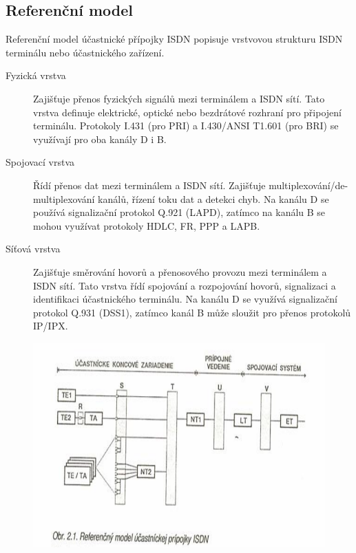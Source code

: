 \subsection{Referenční model}
Referenční model účastnické přípojky ISDN popisuje vrstvovou strukturu ISDN terminálu nebo účastnického zařízení.
\begin{description}
    \item[Fyzická vrstva] Zajišťuje přenos fyzických signálů mezi terminálem a ISDN sítí. Tato vrstva definuje elektrické, optické nebo bezdrátové rozhraní pro připojení terminálu. Protokoly I.431 (pro PRI) a I.430/ANSI T1.601 (pro BRI) se využívají pro oba kanály D i B.
    \item[Spojovací vrstva] Řídí přenos dat mezi terminálem a ISDN sítí. Zajišťuje multiplexování/de-multiplexování kanálů, řízení toku dat a detekci chyb. Na kanálu D se používá signalizační protokol Q.921 (LAPD), zatímco na kanálu B se mohou využívat protokoly HDLC, FR, PPP a LAPB.
    \item[Síťová vrstva] Zajišťuje směrování hovorů a přenosového provozu mezi terminálem a ISDN sítí. Tato vrstva řídí spojování a rozpojování hovorů, signalizaci a identifikaci účastnického terminálu. Na kanálu D se využívá signalizační protokol Q.931 (DSS1), zatímco kanál B může sloužit pro přenos protokolů IP/IPX.
\end{description}

\begin{figure}[!ht]
    \begin{center}
        \includegraphics[scale=0.6]{snimky/ISDN-ref.png}
    \end{center}
\end{figure}

